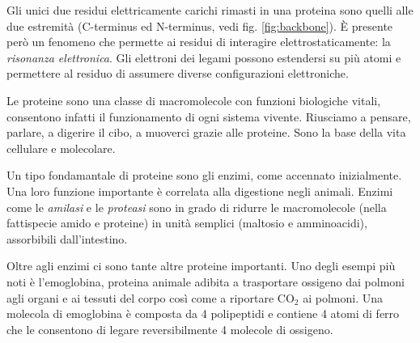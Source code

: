 Gli unici due residui elettricamente carichi rimasti in una proteina sono quelli alle due estremità (C-terminus ed N-terminus, vedi fig. \ref{fig:backbone}). È presente però un fenomeno che permette ai residui di interagire elettrostaticamente: la \textit{risonanza elettronica}. Gli elettroni dei legami possono estendersi su più atomi e permettere al residuo di assumere diverse configurazioni elettroniche. \\

\par Le proteine sono una classe di macromolecole con funzioni biologiche vitali, consentono infatti il funzionamento di ogni sistema vivente. Riusciamo a pensare, parlare, a digerire il cibo, a muoverci grazie alle proteine. Sono la base della vita cellulare e molecolare. 

\par Un tipo fondamantale di proteine sono gli enzimi, come accennato inizialmente. Una loro funzione importante è correlata alla digestione negli animali. Enzimi come le \textit{amilasi} e le \textit{proteasi }sono in grado di ridurre le macromolecole (nella fattispecie amido e proteine) in unità semplici (maltosio e amminoacidi), assorbibili dall'intestino.

\par Oltre agli enzimi ci sono tante altre proteine importanti. Uno degli esempi più noti è l'emoglobina, proteina animale adibita a trasportare ossigeno dai polmoni agli organi e ai tessuti del corpo così come a riportare CO$_{2}$ ai polmoni. Una molecola di emoglobina è composta da 4 polipeptidi e contiene 4 atomi di ferro che le consentono di legare reversibilmente 4 molecole di ossigeno.

